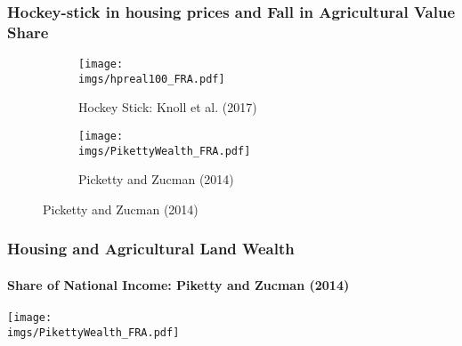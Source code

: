 \documentclass[aspectratio=169]{beamer}
\begin{document}
\begin{frame}
\frametitle{Hockey-stick in housing prices and Fall in Agricultural Value Share}

\begin{figure}
    \centering
    \begin{subfigure}[t]{0.49\textwidth}
        \centering
        \texttt{[image: \\imgs/hpreal100\_FRA.pdf]}
        \caption{Hockey Stick: Knoll et al. (2017)}
        \label{fig:sub1}
    \end{subfigure}\hskip 1mm%
    \begin{subfigure}[t]{0.49\textwidth}
        \centering
        \texttt{[image: \\imgs/PikettyWealth\_FRA.pdf]}
        \caption{Picketty and Zucman (2014)}
        \label{fig:sub2}
    \end{subfigure}
\end{figure}


\end{frame}


\begin{v75mins}
\begin{frame}
\frametitle{Housing and Agricultural Land Wealth}
\framesubtitle{Share of National Income: Piketty and Zucman (2014)}
	\begin{center}
		\texttt{[image: \\imgs/PikettyWealth\_FRA.pdf]}
	\end{center}
\end{frame}\end{v75mins}
\end{document}
